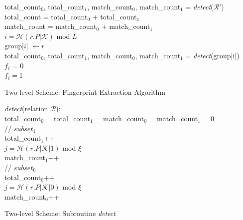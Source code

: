 \begin{algorithm}
    total\_count$_0$, total\_count$_1$, match\_count$_0$, match\_count$_1$ = \textit{detect}($\mathcal{R}'$)\\
    total\_count = total\_count$_0$ + total\_count$_1$\\
    match\_count = match\_count$_0$ + match\_count$_1$\\
    {
        {
            $i = \mathcal{H}(r.P|\mathcal{K})$ mod $L$ \\
            group[$i$] $\leftarrow r$ \\ 
        }
        {
            total\_count$_0$, total\_count$_1$, match\_count$_0$, match\_count$_1$ = \textit{detect}(group[i])\\
            {
                $f_i$ = 0 \\
            }
            {
                $f_i = 1$ \\
            }
        }
    }
    \caption{Two-level Scheme: Fingerprint Extraction Algorithm}
    \label{alg:two-level-extraction}
\end{algorithm}

\begin{algorithm}
    \textit{detect}(relation $\mathcal{R}$):\\
    total\_count$_0$ = total\_count$_1$ = match\_count$_0$ = match\_count$_1$ = 0 \\
    {
        {
            // $subset_1$ \\
            total\_count$_1$++\\
            $j=\mathcal{H}(r.P|\mathcal{K}|1)$ mod $\xi$\\
            {
                match\_count$_1$++\\
            }
        }
        {
            // $subset_0$ \\
            total\_count$_0$++\\
            $j=\mathcal{H}(r.P|\mathcal{K}|0)$ mod $\xi$\\
            {
                match\_count$_0$++\\
            }
        }
    }
    \caption{Two-level Scheme: Subroutine \textit{detect}}
    \label{alg:subroutine-detect-two-level}
\end{algorithm}



